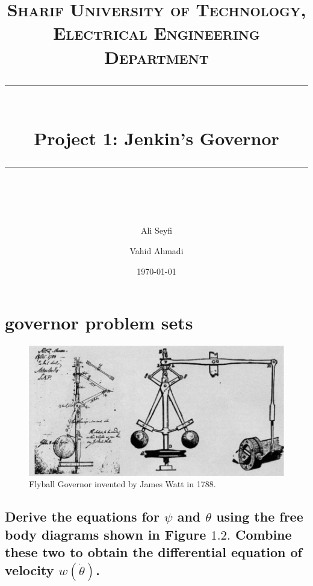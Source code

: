 \documentclass[11pt]{scrartcl} %
\title{	
	\normalfont\normalsize
	\textsc{Sharif University of Technology, Electrical Engineering Department}\\ %
	\vspace{25pt} %
	\rule{\linewidth}{0.5pt}\\ %
	\vspace{20pt} %
	{\huge Project 1: Jenkin’s Governor}\\ %
	\vspace{12pt} %
	\rule{\linewidth}{2pt}\\ %
	\vspace{12pt} %
}
\author{\LARGE Ali Seyfi \and \LARGE Vahid Ahmadi}
\date{\normalsize\today} %
\begin{document}
\maketitle %


\section{governor problem sets}

\begin{figure}[h] %
	\centering
	\includegraphics[width=0.7\columnwidth]{images/p1.JPG} %
	\caption{Flyball Governor invented by James Watt in 1788.}
\end{figure}


\subsection{Derive the equations for $\psi$ and $\theta$ using the free body diagrams shown in Figure $1.2 .$ Combine these two to obtain the differential equation of velocity $w(\dot{\theta})$.}
\end{document}
